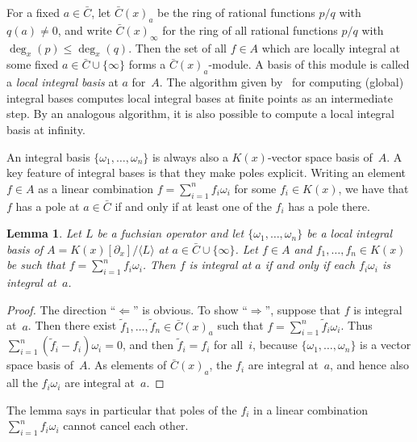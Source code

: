 \documentclass[final,1p,times,authoryear]{elsarticle}
\newtheorem{lemma}[theorem]{Lemma}
\def\<#1>{\langle#1\rangle}
\begin{document}
For a fixed $a\in\bar C$, let $\bar C(x)_a$ be the ring of rational functions $p/q$
with $q(a)\neq0$, and write $\bar C(x)_\infty$ for the ring of all
rational functions $p/q$ with $\deg_x(p)\leq\deg_x(q)$.
Then the set of all $f\in A$ which are locally integral at some
fixed $a\in\bar C\cup\{\infty\}$ forms a $\bar C(x)_a$-module. A basis of this module is
called a \emph{local integral basis} at $a$ for~$A$. The algorithm given by~\cite{kauers15b}
for computing (global) integral bases computes local integral bases at finite
points as an intermediate step. By an analogous algorithm, it is also possible
to compute a local integral basis at infinity.

An integral basis $\{\omega_1,\dots,\omega_n\}$ is always also a $K(x)$-vector space
basis of~$A$. A key feature of integral bases is that they make poles explicit. Writing
an element $f\in A$ as a linear combination $f=\sum_{i=1}^n f_i\omega_i$ for some
$f_i\in K(x)$, we have that $f$ has a pole at $a\in\bar C$ if and only if at least one
of the $f_i$ has a pole there.

\begin{lemma}\label{lemma:1}
  Let $L$ be a fuchsian operator and let
  $\{\omega_1,\dots,\omega_n\}$ be a local integral basis of $A=K(x)[\partial_x]/\<L>$ at $a\in\bar C\cup\{\infty\}$.
  Let $f\in A$ and $f_1,\dots,f_n\in K(x)$ be such that $f=\sum_{i=1}^nf_i\omega_i$.
  Then $f$ is integral at $a$ if and only if each $f_i\omega_i$ is integral at~$a$.
\end{lemma}
\begin{proof}
  The direction ``$\Leftarrow$'' is obvious. To show ``$\Rightarrow$'', suppose
  that $f$ is integral at~$a$. Then there exist $\tilde{f}_1,\dots,\tilde{f}_n\in\bar C(x)_a$ such that
  $f=\sum_{i=1}^n\tilde{f}_i\omega_i$. Thus $\sum_{i=1}^n(\tilde{f}_i-f_i)\omega_i=0$, and then
  $\tilde{f}_i=f_i$ for all~$i$, because $\{\omega_1,\dots,\omega_n\}$ is a vector space basis of~$A$.
  As elements of $\bar C(x)_a$, the $f_i$ are integral at~$a$, and hence also all the $f_i\omega_i$
  are integral at~$a$.
\end{proof}

The lemma says in particular that poles of the $f_i$ in a linear combination
$\sum_{i=1}^n f_i\omega_i$ cannot cancel each other.
\end{document}
